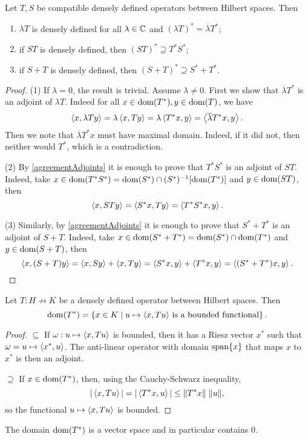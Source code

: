 \begin{proposition} \label{adjointAlgebraicProperties}
Let $T,S$ be compatible densely defined operators between Hilbert spaces. Then
\begin{enumerate}
\item $\lambda T$ is densely defined for all $\lambda\in \mathbb{C}$ and $(\lambda T)^* = \overline{\lambda}T^*$;
\item if $ST$ is densely defined, then $(ST)^* \supseteq T^*S^*$;
\item if $S+T$ is densely defined, then $(S+T)^*\supseteq S^* + T^*$.
\end{enumerate}
\end{proposition}
\begin{proof}
(1) If $\lambda = 0$, the result is trivial. Assume $\lambda \neq 0$. First we show that $\overline{\lambda}T^*$ is an adjoint of $\lambda T$. Indeed for all $x\in\operatorname{dom}(T^*), y\in \operatorname{dom}(T)$, we have
\[ \left\langle x, \lambda Ty \right\rangle = \lambda\left\langle x, Ty \right\rangle = \lambda \left\langle T^* x, y \right\rangle = \left\langle \overline{\lambda}T^*x, y \right\rangle. \]
Then we note that $\overline{\lambda}T^*x$ must have maximal domain. Indeed, if it did not, then neither would $T^*$, which is a contradiction.

(2) By \ref{agreementAdjoints} it is enough to prove that $T^*S^*$ is an adjoint of $ST$. Indeed, take $x\in \operatorname{dom}(T^*S^*) = \operatorname{dom}(S^*)\cap (S^*)^{-1}[\operatorname{dom}(T^*)]$ and $y\in \operatorname{dom} (ST)$, then
\[ \left\langle x, STy \right\rangle = \left\langle S^*x, Ty \right\rangle = \left\langle T^*S^*x, y \right\rangle. \]

(3) Similarly, by \ref{agreementAdjoints} it is enough to prove that $S^*+T^*$ is an adjoint of $S+T$. Indeed, take $x\in \operatorname{dom}(S^*+T^*) = \operatorname{dom}(S^*)\cap \operatorname{dom}(T^*)$ and $y\in \operatorname{dom} (S+T)$, then
\[ \left\langle x, (S+T)y \right\rangle = \left\langle x,Sy \right\rangle+\left\langle x, Ty \right\rangle = \left\langle S^*x, y \right\rangle + \left\langle T^*x, y \right\rangle = \left\langle (S^* + T^*)x, y \right\rangle. \]
\end{proof}

\begin{lemma}
Let $T: H\not\to K$ be a densely defined operator between Hilbert spaces. Then
\[ \operatorname{dom}(T^*) = \left\{ x\in K \;\middle|\; \text{$u\mapsto \left\langle x, Tu \right\rangle$ is a bounded functional} \right\}. \]
\end{lemma}
\begin{proof}
$\boxed{\subseteq}$ If $\omega: u\mapsto \left\langle x, Tu \right\rangle$ is bounded, then it has a Riesz vector $x^*$ such that $\omega = u\mapsto \left\langle x^*, u \right\rangle$. The anti-linear operator with domain $\operatorname{span}\{x\}$ that maps $x$ to $x^*$ is then an adjoint.

$\boxed{\supseteq}$ If $x\in\operatorname{dom}(T^*)$, then, using the Cauchy-Schwarz inequality,
\[ |\left\langle x,Tu \right\rangle| = |\left\langle T^*x,u \right\rangle| \leq \lVert T^*x\rVert\;\lVert u\rVert, \]
so the functional $u\mapsto \left\langle x, Tu \right\rangle$ is bounded.
\end{proof}
\begin{corollary}
The domain $\operatorname{dom}(T^*)$ is a vector space and in particular contains $0$.
\end{corollary}

